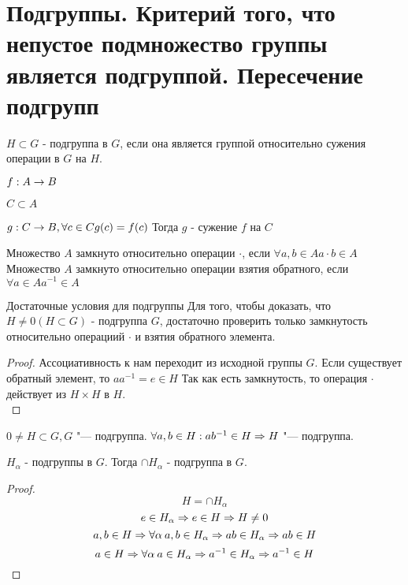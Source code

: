 \section{Подгруппы. Критерий того, что непустое подмножество группы является подгруппой. Пересечение подгрупп}
\begin{Def}
	$H \subset G$ - подгруппа в $G$, если она является группой относительно сужения операции в $G$ на $H$. \\
\end{Def}

\begin{Def}
	$f: A \rightarrow B$
	
	$C \subset A$
	
	$g: C \rightarrow B, \forall c \in C g(c) = f(c)$
	Тогда $g$ - сужение $f$ на $C$	\\
\end{Def}

\begin{Def}
	Множество $A$ замкнуто относительно операции $\cdot$, если $\forall a, b \in A a \cdot b \in A$
	Множество $A$ замкнуто относительно операции взятия обратного, если $\forall a \in A a^{-1} \in A$ \\
\end{Def}

\begin{theorem}{Достаточные условия для подгруппы}
Для того, чтобы доказать, что $H \ne 0(H \subset G)$ - подгруппа $G$, достаточно проверить только замкнутость относительно операциий $\cdot$ и взятия обратного элемента. \\
\end{theorem}
\begin{proof}
Ассоциативность к нам переходит из исходной группы $G$.
Если существует обратный элемент, то $a a^{-1} = e \in H$
Так как есть замкнутость, то операция $\cdot$ действует из $H \times H$ в $H$.   \\
\end{proof}

\begin{conseq}
$0 \ne H \subset G, G$ "--- подгруппа.
$\forall a, b \in H: ab^{-1} \in H \Rightarrow H$ "--- подгруппа.  
\end{conseq}

\begin{theorem}{}
	$H_\alpha$ - подгруппы в $G$. Тогда $\cap H_\alpha$ - подгруппа в $G$.
\end{theorem}
\begin{proof}
	$$H = \cap H_\alpha$$
	$$e \in H_{\alpha} \Rightarrow e \in H \Rightarrow H \ne 0$$
	$$a, b \in H \Rightarrow \forall \alpha \: a, b \in H_\alpha \Rightarrow ab \in H_\alpha \Rightarrow ab \in H$$
	$$a \in H \Rightarrow \forall \alpha \: a \in H_\alpha \Rightarrow a^{-1} \in H_\alpha \Rightarrow a^{-1} \in H$$
\end{proof}
